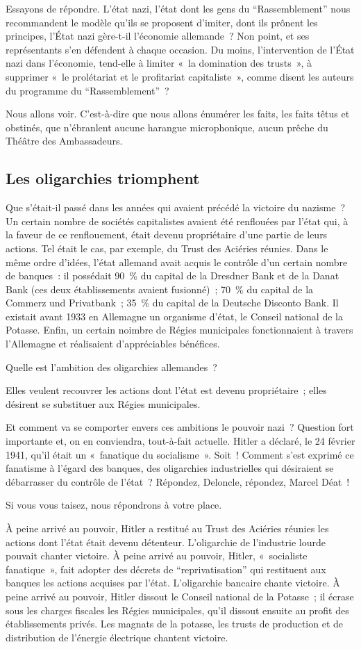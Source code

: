 \documentclass[french,twoside]{book} %
\begin{document}
Essayons de répondre. L’état nazi, l’état dont les gens du “Rassemblement” nous recommandent le modèle qu’ils se proposent d’imiter, dont ils prônent les principes, l’État nazi gère-t-il l’économie allemande ? Non point, et ses représentants s’en défendent à chaque occasion. Du moins, l’intervention de l’État nazi dans l’économie, tend-elle à limiter « la domination des trusts », à supprimer « le prolétariat et le profitariat capitaliste », comme disent les auteurs du programme du “Rassemblement” ?\par
Nous allons voir. C’est-à-dire que nous allons énumérer les faits, les faits têtus et obstinés, que n’ébranlent aucune harangue microphonique, aucun prêche du Théâtre des Ambassadeurs.
\subsection[Les oligarchies triomphent]{Les oligarchies triomphent}
\noindent Que s’était-il passé dans les années qui avaient précédé la victoire du nazisme ? Un certain nombre de sociétés capitalistes avaient été renflouées par l’état qui, à la faveur de ce renflouement, était devenu propriétaire d’une partie de leurs actions. Tel était le cas, par exemple, du Trust des Aciéries réunies. Dans le même ordre d’idées, l’état allemand avait acquis le contrôle d’un certain nombre de banques : il possédait 90 \% du capital de la Dresdner Bank et de la Danat Bank (ces deux établissements avaient fusionné) ; 70 \% du capital de la Commerz und Privatbank ; 35 \% du capital de la Deutsche Disconto Bank. Il existait avant 1933 en Allemagne un organisme d’état, le Conseil national de la Potasse. Enfin, un certain noimbre de Régies municipales fonctionnaient à travers l’Allemagne et réalisaient d’appréciables bénéfices.\par
Quelle est l’ambition des oligarchies allemandes ?\par
Elles veulent recouvrer les actions dont l’état est devenu propriétaire ; elles désirent se substituer aux Régies municipales.\par
Et comment va se comporter envers ces ambitions le pouvoir nazi ? Question fort importante et, on en conviendra, tout-à-fait actuelle. Hitler a déclaré, le 24 février 1941, qu’il était un « fanatique du socialisme ». Soit ! Comment s’est exprimé ce fanatisme à l’égard des banques, des oligarchies industrielles qui désiraient se débarrasser du contrôle de l’état ? Répondez, Deloncle, répondez, Marcel Déat !\par
Si vous vous taisez, nous répondrons à votre place.\par
À peine arrivé au pouvoir, Hitler a restitué au Trust des Aciéries réunies les actions dont l’état était devenu détenteur. L’oligarchie de l’industrie lourde pouvait chanter victoire. À peine arrivé au pouvoir, Hitler, « socialiste fanatique », fait adopter des décrets de “reprivatisation” qui restituent aux banques les actions acquises par l’état. L’oligarchie bancaire chante victoire. À peine arrivé au pouvoir, Hitler dissout le Conseil national de la Potasse ; il écrase sous les charges fiscales les Régies municipales, qu’il dissout ensuite au profit des établissements privés. Les magnats de la potasse, les trusts de production et de distribution de l’énergie électrique chantent victoire.
\end{document}
